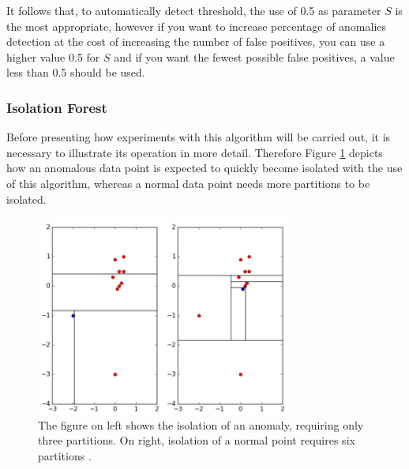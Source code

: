\vspace{5mm} %

It follows that, to automatically detect threshold, the use of 0.5 as parameter $S$ is the most appropriate, however if you want to increase  percentage of anomalies detection at the cost of increasing the number of false positives, you can use a higher value 0.5 for $S$ and if you want the fewest possible false positives, a value less than 0.5 should be used.

\subsubsection{Isolation Forest}

Before presenting how experiments with this algorithm will be carried out, it is necessary to illustrate its operation in more detail. Therefore Figure \ref{fig:isolartion-forest} depicts how an anomalous data point is expected to quickly become isolated with the use of this algorithm, whereas a normal data point needs more partitions to be isolated.

\begin{figure}[h!]
  \begin{center}	\includegraphics[width=0.75\textwidth, frame]{imagenes/Cap5/isolation-forest}
  \caption{The figure on left shows the isolation of an anomaly, requiring only three partitions. On right, isolation of a normal point requires six partitions \protect\cite{Reference60}.} 
  \label{fig:isolartion-forest}
  \end{center}
\end{figure}

